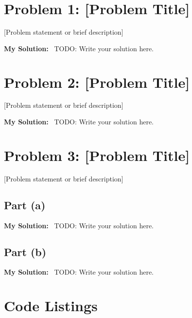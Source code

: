 \documentclass[11pt]{article}
\newenvironment{mysolution}
  {\begin{shaded}\noindent\textbf{My Solution:}\ }
  {\end{shaded}}
\begin{document}
\section{Problem 1: [Problem Title]}

[Problem statement or brief description]

\begin{mysolution}
TODO: Write your solution here.
\end{mysolution}

\section{Problem 2: [Problem Title]}

[Problem statement or brief description]

\begin{mysolution}
TODO: Write your solution here.
\end{mysolution}

\section{Problem 3: [Problem Title]}

[Problem statement or brief description]

\subsection{Part (a)}

\begin{mysolution}
TODO: Write your solution here.
\end{mysolution}

\subsection{Part (b)}

\begin{mysolution}
TODO: Write your solution here.
\end{mysolution}

% 

\newpage
\appendix
\section{Code Listings}
% 
\end{document}
